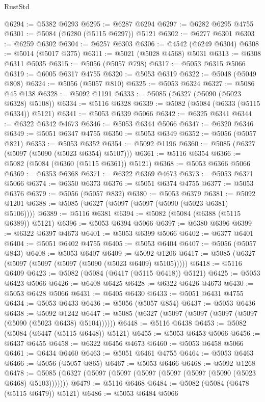 \begin{lexlean}{RustStd}
\begin{coremodule}
@6294 := @5382 @6293
@6295 := @6287 @6294
@6297 := @6282 @6295 @4755
@6301 := @5084 (@6280 (@5115 @6297)) @5121
@6302 := @6277 @6301
@6303 := @6259 @6302
@6304 := @6257 @6303
@6306 := @4542 (@6249 @6304)
@6308 := @5014 (@5017 @375)
@6311 := @5021 (@5028 @4568) @5031
@6313 := @6308 @6311 @5035
@6315 := @5056 (@5057 @798)
@6317 := @5053 @6315 @5066
@6319 := @6005 @6317 @4755
@6320 := @5053 @6319
@6322 := @5048 (@5049 @808)
@6324 := @5056 (@5057 @810)
@6325 := @5053 @6324
@6327 := @5086 @45 @138
@6328 := @5092 @1191
@6333 := @5085 (@6327 (@5090 (@5023 @6328) @5108))
@6334 := @5116 @6328
@6339 := @5082 (@5084 (@6333 (@5115 @6334)) @5121)
@6341 := @5053 @6339 @5066
@6342 := @6325 @6341
@6344 := @6322 @6342 @4673
@6346 := @5053 @6344 @5066
@6347 := @6320 @6346
@6349 := @5051 @6347 @4755
@6350 := @5053 @6349
@6352 := @5056 (@5057 @821)
@6353 := @5053 @6352
@6354 := @5092 @1196
@6360 := @5085 (@6327 (@5097 (@5090 (@5023 @6354) @5107)))
@6361 := @5116 @6354
@6366 := @5082 (@5084 (@6360 (@5115 @6361)) @5121)
@6368 := @5053 @6366 @5066
@6369 := @6353 @6368
@6371 := @6322 @6369 @4673
@6373 := @5053 @6371 @5066
@6374 := @6350 @6373
@6376 := @5051 @6374 @4755
@6377 := @5053 @6376
@6379 := @5056 (@5057 @832)
@6380 := @5053 @6379
@6381 := @5092 @1201
@6388 := @5085 (@6327 (@5097 (@5097 (@5090 (@5023 @6381) @5106))))
@6389 := @5116 @6381
@6394 := @5082 (@5084 (@6388 (@5115 @6389)) @5121)
@6396 := @5053 @6394 @5066
@6397 := @6380 @6396
@6399 := @6322 @6397 @4673
@6401 := @5053 @6399 @5066
@6402 := @6377 @6401
@6404 := @5051 @6402 @4755
@6405 := @5053 @6404
@6407 := @5056 (@5057 @843)
@6408 := @5053 @6407
@6409 := @5092 @1206
@6417 := @5085 (@6327 (@5097 (@5097 (@5097 (@5090 (@5023 @6409) @5105)))))
@6418 := @5116 @6409
@6423 := @5082 (@5084 (@6417 (@5115 @6418)) @5121)
@6425 := @5053 @6423 @5066
@6426 := @6408 @6425
@6428 := @6322 @6426 @4673
@6430 := @5053 @6428 @5066
@6431 := @6405 @6430
@6433 := @5051 @6431 @4755
@6434 := @5053 @6433
@6436 := @5056 (@5057 @854)
@6437 := @5053 @6436
@6438 := @5092 @1242
@6447 := @5085 (@6327 (@5097 (@5097 (@5097 (@5097 (@5090 (@5023 @6438) @5104))))))
@6448 := @5116 @6438
@6453 := @5082 (@5084 (@6447 (@5115 @6448)) @5121)
@6455 := @5053 @6453 @5066
@6456 := @6437 @6455
@6458 := @6322 @6456 @4673
@6460 := @5053 @6458 @5066
@6461 := @6434 @6460
@6463 := @5051 @6461 @4755
@6464 := @5053 @6463
@6466 := @5056 (@5057 @865)
@6467 := @5053 @6466
@6468 := @5092 @1268
@6478 := @5085 (@6327 (@5097 (@5097 (@5097 (@5097 (@5097 (@5090 (@5023 @6468) @5103)))))))
@6479 := @5116 @6468
@6484 := @5082 (@5084 (@6478 (@5115 @6479)) @5121)
@6486 := @5053 @6484 @5066

\end{coremodule}
\end{lexlean}
